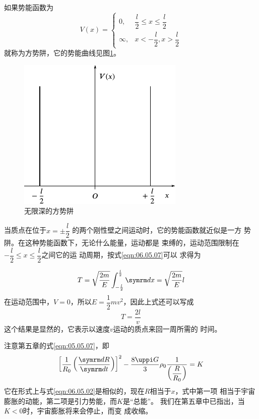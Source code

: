 \example 如果势能函数为
\begin{equation*}
  V \left( x \right) = \begin{cases}
    0,      & \dfrac { l }{ 2 } \leqslant x \leqslant \dfrac { l } { 2 } \\
    \infty, & x < - \dfrac { l } { 2 }, x > \dfrac { l } { 2 }
  \end{cases}
\end{equation*}
就称为方势阱，它的势能曲线见图\ref{fig:06.13}。

\begin{figure}
  \vspace{-2em}
  \centering
  \includegraphics{figure/fig06.13}
  \caption{无限深的方势阱}
  \label{fig:06.13}
\end{figure}
当质点在位于$ x = \pm \dfrac { l } { 2 } $
的两个刚性壁之间运动时，它的势能函数就近似是一方
势阱。在这种势能函数下，无论什么能量，运动都是
束缚的，运动范围限制在
$ - \dfrac { l } { 2 } \leqslant x \leqslant \dfrac { l } { 2 }   $之间它的运
动周期，按式\eqref{eqn:06.05.07}可以
求得为

\begin{equation*}
  T = \sqrt { \frac { 2 m } { E } } \int _ { - \frac { l } { 2 } } ^ { \frac { l } { 2 } } \dif x = \sqrt { \frac { 2 m } { E } } l
\end{equation*}
在运动范围中，$ V = 0   $，所以$ E = \dfrac { 1 } { 2 } m v ^ { 2 }   $，因此上式还可以写成
\begin{equation*}
  T = \frac { 2 l } { v }
\end{equation*}
这个结果是显然的，它表示以速度$ v $运动的质点来回一周所需的
时间。

\clearpage
\example 注意第五章的式\eqref{eqn:05.05.07}，即
\begin{equation}\label{eqn:06.05.08}
  \left[ \frac { 1 } { R _ { 0 } } \left( \frac { \dif R } { \dif t } \right) \right] ^ { 2 }- \frac { 8 \uppi G } { 3 } \rho _ 0 \frac { 1 } { \left( \dfrac { R } { R _ { 0 } } \right) } = K
\end{equation}
它在形式上与式\eqref{eqn:06.05.02}是相似的，现在$ R $相当于$ x $，式中第一项
相当于宇宙膨胀的动能，第二项是引力势能，而$ K $是“总能”。
我们在第五章中已指出，当$  K < 0   $时，宇宙膨胀将来会停止，而变
成收缩。


